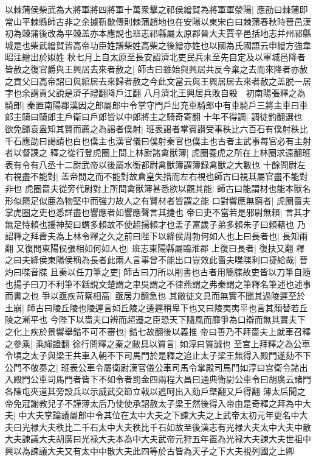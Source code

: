 以棘蒲侯柴武為大將軍將四將軍十萬衆擊之祁侯繒賀為將軍軍滎陽|{
	應劭曰棘蒲即常山平棘縣師古非之余據靳歙傳則棘蒲趙地也在安陽以東宋白曰棘蒲春秋時晉邑漢初為棘蒲後改為平棘盖亦本應說也班志祁縣屬太原郡晉大夫賈辛邑括地志并州祁縣城是也柴武繒賀皆高帝功臣姓譜柴姓高柴之後繒亦姓也以國為氏國語云申繒方強韋昭注繒出於姒姓}
秋七月上自太原至長安詔濟北吏民兵未至先自定及以軍城邑降者皆赦之復官爵與王興居去來者赦之|{
	師古曰雖始與興居共反今棄之去而來降者亦赦之貢父曰高帝詔曰與綰居去來歸者赦之今此文當云與王興居居去來者赦之盖脱一居字也余謂貢父說是濟子禮翻降戶江翻}
八月濟北王興居兵敗自殺　初南陽張釋之為騎郎|{
	秦置南陽郡漢因之郎屬郎中令掌守門戶出充車騎郎中有車騎戶三將主車曰車郎主騎曰騎郎主戶衛曰戶郎皆以中郎將主之騎奇寄翻}
十年不得調|{
	調徒釣翻選也}
欲免歸袁盎知其賢而薦之為謁者僕射|{
	班表謁者掌賓讃受事秩比六百石有僕射秩比千石應劭曰謁請也白也僕主也漢官儀曰僕射秦官也僕主也古者主武事每官必有主射者以督課之}
釋之從行登虎圈上問上林尉諸禽獸簿|{
	虎圈養虎之所在上林圈求遠翻班表有令有八丞十二尉武帝以後屬水衡都尉禽獸簿謂簿録禽獸之大數也}
十餘問尉左右視盡不能對|{
	盖帝問之而不能對故倉皇失措而左右視也師古曰視其屬官盡不能對非也}
虎圈嗇夫從旁代尉對上所問禽獸簿甚悉欲以觀其能|{
	師古曰能謂材也能本獸名形似羆足似鹿為物堅中而強力故人之有賢材者皆謂之能}
口對響應無窮者|{
	虎圈嗇夫掌虎圈之吏也悉詳盡也響應者如響應聲言其捷也}
帝曰吏不當若是邪尉無賴|{
	言其才無足恃賴也援神契曰蝟多賴故不使超揚賴才也孟子富歲子弟多賴朱子曰賴藉也}
乃詔釋之拜嗇夫為上林令釋之久之前曰陛下以絳侯周勃何如人也上曰長者也|{
	長知兩翻}
又復問東陽侯張相如何如人也|{
	班志東陽縣屬臨淮郡}
上復曰長者|{
	復扶又翻}
釋之曰夫絳侯東陽侯稱為長者此兩人言事曾不能出口豈效此嗇夫喋喋利口捷給哉|{
	晉灼曰喋音牒}
且秦以任刀筆之吏|{
	師古曰刀所以削書也古者用簡牒故吏皆以刀筆自隨也揚子曰刀不利筆不銛說文楚謂之聿吳謂之不律燕謂之弗秦謂之筆釋名筆述也述事而書之也}
爭以亟疾苛察相高|{
	亟居力翻急也}
其敝徒文具而無實不聞其過陵遲至於土崩|{
	師古曰陵丘陵也陵遲言如丘陵之逶遲稍卑下也又曰陵夷夷平也言其頹替若丘陵之漸平也}
今陛下以嗇夫口辨而超遷之臣恐天下隨風而靡爭為口辯而無其實夫下之化上疾於景響舉錯不可不審也|{
	錯七故翻後以義推}
帝曰善乃不拜嗇夫上就車召釋之參乘|{
	乘䋲證翻}
徐行問釋之秦之敝具以質言|{
	如淳曰質誠也}
至宫上拜釋之為公車令頃之太子與梁王共車入朝不下司馬門於是釋之追止太子梁王無得入殿門遂劾不下公門不敬奏之|{
	班表公車令屬衛尉漢官儀公車司馬令掌殿司馬門如淳曰宫衛令諸出入殿門公車司馬門者皆下不如令者罰金四兩程大昌曰通典衛尉公車令曰胡廣云諸門各陳屯夾道其旁設兵以示威武交節立戟以遮呵出入劾戶槩翻又戶得翻}
薄太后聞之帝免冠謝教兒子不謹薄太后乃使使承詔赦太子梁王然後得入帝由是奇釋之拜為中大夫|{
	中大夫掌論議屬郎中令其位在太中大夫之下諫大夫之上武帝太初元年更名中大夫曰光禄大夫秩比二千石太中大夫秩比千石如故至後漢志有光禄大夫太中大夫中散大夫諫議大夫胡廣曰光禄大夫本為中大夫武帝元狩五年置為光禄大夫諫大夫世祖中興以為諫議大夫又有太中中散大夫此四等於古皆為天子之下大夫視列國之上卿}
